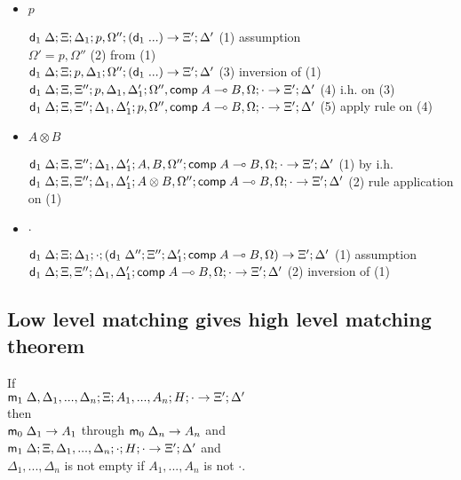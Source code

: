 \begin{itemize}
\item $p$

$\mathsf{d}_1 \; \Delta; \Xi; \Delta_1; p, \Omega''; (\mathsf{d}_1 \; ...) \rightarrow \Xi'; \Delta'$ \hfill (1) assumption \\
$\Omega' = p, \Omega''$ \hfill (2) from (1) \\
$\mathsf{d}_1 \; \Delta; \Xi; p, \Delta_1; \Omega''; (\mathsf{d}_1 \; ...) \rightarrow \Xi'; \Delta'$ \hfill (3) inversion of (1) \\
$\mathsf{d}_1 \; \Delta; \Xi, \Xi''; p, \Delta_1, \Delta'_1; \Omega'', \mathsf{comp} \; A \multimap B, \Omega; \cdot \rightarrow \Xi'; \Delta'$ \hfill (4) i.h. on (3) \\
$\mathsf{d}_1 \; \Delta; \Xi, \Xi''; \Delta_1, \Delta'_1; p, \Omega'', \mathsf{comp} \; A \multimap B, \Omega; \cdot \rightarrow \Xi'; \Delta'$ \hfill (5) apply rule on (4) \\

\item $A \otimes B$

$\mathsf{d}_1 \; \Delta; \Xi, \Xi''; \Delta_1, \Delta'_1; A, B, \Omega''; \mathsf{comp} \; A \multimap B, \Omega; \cdot \rightarrow \Xi'; \Delta'$ \hfill (1) by i.h. \\
$\mathsf{d}_1 \; \Delta; \Xi, \Xi''; \Delta_1, \Delta'_1; A \otimes B, \Omega''; \mathsf{comp} \; A \multimap B, \Omega; \cdot \rightarrow \Xi'; \Delta'$ \hfill (2) rule application on (1) \\

\item $\cdot$

$\mathsf{d}_1 \; \Delta; \Xi; \Delta_1; \cdot; (\mathsf{d}_1 \; \Delta''; \Xi''; \Delta'_1; \mathsf{comp} \; A \multimap B, \Omega) \rightarrow \Xi'; \Delta'$ \hfill (1) assumption \\
$\mathsf{d}_1 \; \Delta; \Xi, \Xi''; \Delta_1, \Delta'_1; \mathsf{comp} \; A \multimap B, \Omega; \cdot \rightarrow \Xi'; \Delta'$ \hfill (2) inversion of (1) \\

\end{itemize}

\subsection{Low level matching gives high level matching theorem}

If \\
$\mathsf{m}_1 \; \Delta, \Delta_1, ..., \Delta_n; \Xi; A_1, ..., A_n; H; \cdot \rightarrow \Xi'; \Delta'$ \\
then \\
$\mathsf{m}_0 \; \Delta_1 \rightarrow A_1$ through $\mathsf{m}_0 \; \Delta_n \rightarrow A_n$ and \\
$\mathsf{m}_1 \; \Delta; \Xi, \Delta_1, ..., \Delta_n; \cdot; H; \cdot \rightarrow \Xi'; \Delta'$ and \\
$\Delta_1, ..., \Delta_n$ is not empty if $A_1, ..., A_n$ is not $\cdot$.

